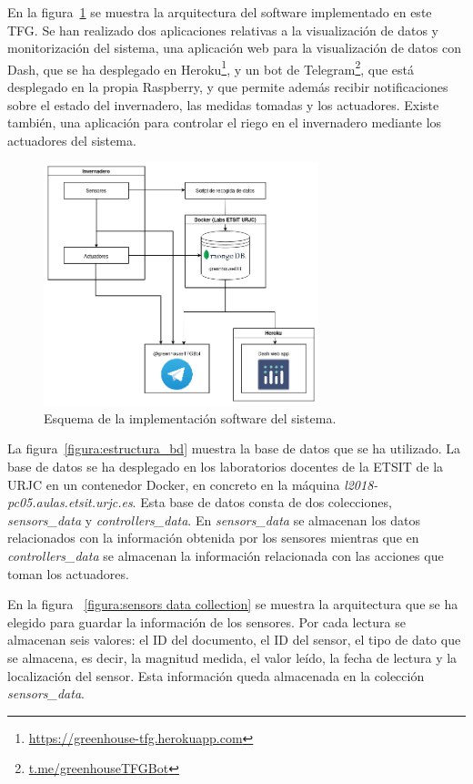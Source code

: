 \documentclass[a4paper, 12pt, oneside]{book}
\begin{document}
En la figura~\ref{figura:esquema_general_software} se muestra la arquitectura del software implementado en este TFG. Se han realizado dos aplicaciones relativas a la visualización de datos y monitorización del sistema, una aplicación web para la visualización de datos con Dash, que se ha desplegado en Heroku\footnote{\url{https://greenhouse-tfg.herokuapp.com}}, y un bot de Telegram\footnote{\url{t.me/greenhouseTFGBot}}, que está desplegado en la propia Raspberry, y que permite además recibir notificaciones sobre el estado del invernadero, las medidas tomadas y los actuadores.
Existe también, una aplicación para controlar el riego en el invernadero mediante los actuadores del sistema.

\begin{figure}[H]
	\centering
    \includegraphics[width=8cm, keepaspectratio]{img/esquema_general_software}
    \caption{Esquema de la implementación software del sistema.}
    \label{figura:esquema_general_software}
\end{figure}

La figura~\ref{figura:estructura_bd} muestra la base de datos que se ha utilizado. La base de datos se ha desplegado en los laboratorios docentes de la ETSIT de la URJC en un contenedor Docker, en concreto en la máquina \textit{l2018-pc05.aulas.etsit.urjc.es}. Esta base de datos consta de dos colecciones, \textit{sensors\_data} y \textit{controllers\_data}. En \textit{sensors\_data} se almacenan los datos relacionados con la información obtenida por los sensores mientras que en \textit{controllers\_data} se almacenan la información relacionada con las acciones que toman los actuadores.

En la figura ~\ref{figura:sensors data collection} se muestra la arquitectura que se ha elegido para guardar la información de los sensores. Por cada lectura se almacenan seis valores: el ID del documento, el ID del sensor, el tipo de dato que se almacena, es decir, la magnitud medida, el valor leído, la fecha de lectura y la localización del sensor. Esta información queda almacenada en la colección \textit{sensors\_data}.
\end{document}
